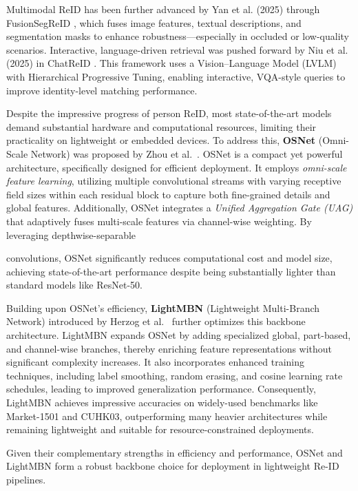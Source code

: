 \documentclass[../main.tex]{subfiles}
\begin{document}
Multimodal ReID has been further advanced by Yan et al. (2025) through \\ FusionSegReID \cite{fusionsegreid}, which fuses image features, textual descriptions, and \\ segmentation masks to enhance robustness—especially in occluded or low-quality scenarios. Interactive, language-driven retrieval was pushed forward by Niu et al. (2025) in ChatReID \cite{chatreid}. This framework uses a Vision–Language Model (LVLM) with Hierarchical Progressive Tuning, enabling interactive, VQA-style queries to improve identity-level matching performance.

Despite the impressive progress of person ReID, most state-of-the-art models demand substantial hardware and computational resources, limiting their practicality on lightweight or embedded devices. To address this, \textbf{OSNet} (Omni-Scale Network) was proposed by Zhou et al.~\cite{zhou2019omniscalefeaturelearningperson}. OSNet is a compact yet powerful architecture, specifically designed for efficient deployment. It employs \textit{omni-scale feature learning}, utilizing multiple convolutional streams with varying receptive field sizes within each residual block to capture both fine-grained details and global features. Additionally, OSNet integrates a \textit{Unified Aggregation Gate (UAG)} that adaptively fuses multi-scale features via channel-wise weighting. By leveraging depthwise-separable 

convolutions, OSNet significantly reduces computational cost and model size, achieving state-of-the-art performance despite being substantially lighter than standard models like ResNet-50.

Building upon OSNet's efficiency, \textbf{LightMBN} (Lightweight Multi-Branch Network) introduced by Herzog et al.~\cite{Herzog_2021} further optimizes this backbone architecture. LightMBN expands OSNet by adding specialized global, part-based, and channel-wise branches, thereby enriching feature representations without significant complexity increases. It also incorporates enhanced training techniques, including label smoothing, random erasing, and cosine learning rate schedules, leading to improved generalization performance. Consequently, LightMBN achieves impressive accuracies on widely-used benchmarks like Market-1501 and CUHK03, outperforming many heavier architectures while remaining lightweight and suitable for resource-constrained deployments.

Given their complementary strengths in efficiency and performance, OSNet and LightMBN form a robust backbone choice for deployment in lightweight Re-ID pipelines.
\end{document}
